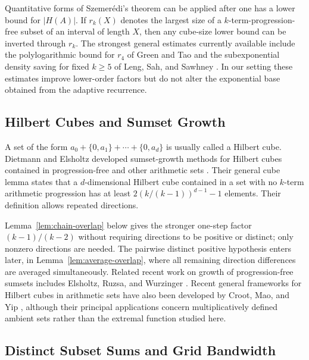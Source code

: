 \documentclass[11pt]{article}
\numberwithin{equation}{section}
\theoremstyle{definition}
\theoremstyle{remark}
\begin{document}
\bigskip
\noindent
Quantitative forms of Szemer\'edi's theorem can be applied after one has a lower bound for $|H(A)|$. If $r_k(X)$ denotes the largest size of a $k$-term-progression-free subset of an interval of length $X$, then any cube-size lower bound can be inverted through $r_k$. The strongest general estimates currently available include the polylogarithmic bound for $r_4$ of Green and Tao \cite{GreenTao2017} and the subexponential density saving for fixed $k\ge5$ of Leng, Sah, and Sawhney \cite{LengSahSawhney2024}. In our setting these estimates improve lower-order factors but do not alter the exponential base obtained from the adaptive recurrence.

\subsection{Hilbert Cubes and Sumset Growth}

A set of the form $a_0+\{0,a_1\}+\cdots+\{0,a_d\}$ is usually called a Hilbert cube. Dietmann and Elsholtz developed sumset-growth methods for Hilbert cubes contained in progression-free and other arithmetic sets \cite{DietmannElsholtz2012,DietmannElsholtz2015}. Their general cube lemma states that a $d$-dimensional Hilbert cube contained in a set with no $k$-term arithmetic progression has at least $2(k/(k-1))^{d-1}-1$ elements. Their definition allows repeated directions.

\bigskip
\noindent
Lemma~\ref{lem:chain-overlap} below gives the stronger one-step factor $(k-1)/(k-2)$ without requiring directions to be positive or distinct; only nonzero directions are needed. The pairwise distinct positive hypothesis enters later, in Lemma~\ref{lem:average-overlap}, where all remaining direction differences are averaged simultaneously. Related recent work on growth of progression-free sumsets includes Elsholtz, Ruzsa, and Wurzinger \cite{ElsholtzRuzsaWurzinger2025}. Recent general frameworks for Hilbert cubes in arithmetic sets have also been developed by Croot, Mao, and Yip \cite{CrootMaoYip2026}, although their principal applications concern multiplicatively defined ambient sets rather than the extremal function studied here.

\subsection{Distinct Subset Sums and Grid Bandwidth}
\end{document}
